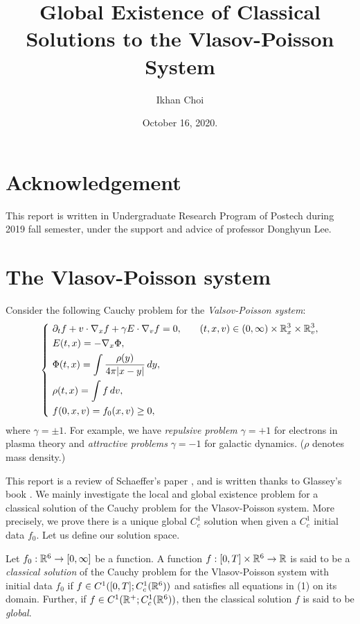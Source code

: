 \documentclass[12pt]{article}
\title{Global Existence of Classical Solutions to the Vlasov-Poisson System}
\author{Ikhan Choi}
\date{October 16, 2020.}
\begin{document}
\maketitle
\tableofcontents

\section*{Acknowledgement}
This report is written in Undergraduate Research Program of Postech during 2019 fall semester, under the support and advice of professor Donghyun Lee.


\clearpage
\section{The Vlasov-Poisson system}
Consider the following Cauchy problem for the \emph{Valsov-Poisson system}:
\begin{align}
\left\{\ \begin{alignedat}{2}
&\pd_tf+v\cdot\nabla_xf+\gamma E\cdot\nabla_vf=0,&&\qquad(t,x,v)\in(0,\infty)\times\R_x^3\times\R_v^3,\\
&E(t,x)=-\nabla_x\Phi,\\
&\Phi(t,x)=\int\frac{\rho(y)}{4\pi|x-y|}\,dy,\\
&\rho(t,x)=\int f\,dv,\\
&f(0,x,v)=f_0(x,v)\ge0,
\end{alignedat}\right.
\end{align}
where $\gamma=\pm1$.
For example, we have \emph{repulsive problem} $\gamma=+1$ for electrons in plasma theory and \emph{attractive problems} $\gamma=-1$ for galactic dynamics.
($\rho$ denotes mass density.)

This report is a review of Schaeffer's paper \cite{schaeffer1991global}, and is written thanks to Glassey's book \cite{glassey1996cauchy}.
We mainly investigate the local and global existence problem for a classical solution of the Cauchy problem for the Vlasov-Poisson system.
More precisely, we prove there is a unique global $C_c^1$ solution when given a $C_c^1$ initial data $f_0$.
Let us define our solution space.

\begin{defn*}
Let $f_0:\mathbb{R}^6\to[0,\infty]$ be a function.
A function $f:[0,T]\times\mathbb{R}^6\to\mathbb{R}$ is said to be a \emph{classical solution} of the Cauchy problem for the Vlasov-Poisson system with initial data $f_0$ if $f\in C^1([0,T];C_c^1(\mathbb{R}^6))$ and satisfies all equations in (1) on its domain.
Further, if $f\in C^1(\mathbb{R}^+;C_c^1(\mathbb{R}^6))$, then the classical solution $f$ is said to be \emph{global}.
\end{defn*}
\end{document}
